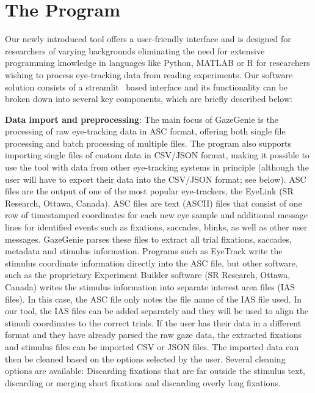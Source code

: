 \documentclass[twocolumn]{article}
\begin{document}
\section{The Program}
Our newly introduced tool offers a user-friendly interface and is designed for researchers of varying backgrounds eliminating the need for extensive programming knowledge in languages like Python, MATLAB or R for researchers wishing to process eye-tracking data from reading experiments. Our software solution consists of a streamlit~\cite{streamlitStreamlitFasterWay2021} based interface and its functionality can be broken down into several key components, which are briefly described below:

\textbf{Data import and preprocessing}: The main focus of GazeGenie is the processing of raw eye-tracking data in ASC format, offering both single file processing and batch processing of multiple files. The program also supports importing single files of custom data in CSV/JSON format, making it possible to use the tool with data from other eye-tracking systems in principle (although the user will have to export their data into the CSV/JSON format; see below). ASC files are the output of one of the most popular eye-trackers, the EyeLink (SR Research, Ottawa, Canada). ASC files are text (ASCII) files  that consist of one row of timestamped coordinates for each new eye sample and additional message lines for identified events such as fixations, saccades,  blinks, as well as other user messages. GazeGenie parses these files to extract all trial fixations, saccades, metadata and stimulus information. Programs such as EyeTrack write the stimulus  coordinate information directly into the ASC file, but other software, such as the proprietary Experiment Builder software (SR Research, Ottawa, Canada) writes the stimulus information into separate interest area files (IAS files). In this case, the ASC file only notes the file name of the IAS file used. In our tool, the IAS files can be added separately and they will be used to align the stimuli coordinates to the correct trials. If the user has their data in a different format and they have already parsed the raw gaze data, the extracted fixations and stimulus files can be imported  CSV or JSON files. The imported data can then be cleaned based on the options selected by the user. Several cleaning options are available: Discarding fixations that are far outside the stimulus text, discarding or merging short fixations and discarding overly long fixations. 
\end{document}
